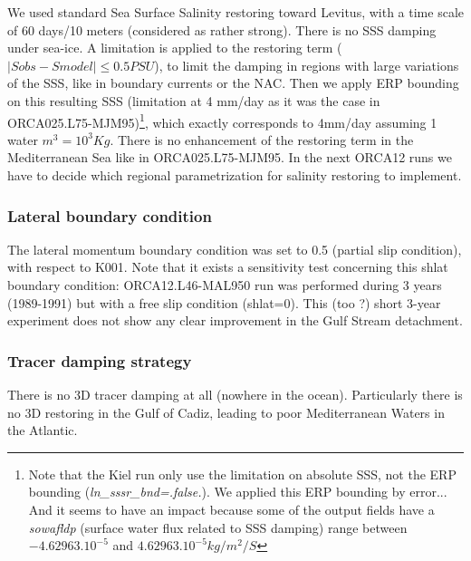 \documentclass[12pt]{article}
\begin{document}
We used standard Sea Surface Salinity restoring toward Levitus, with a time scale of 60 days/10 meters (considered as rather strong). There is no SSS damping under sea-ice. 
A limitation is applied to the restoring term ($|Sobs - Smodel| \leq 0.5 PSU$), to limit the damping in regions with large variations of the SSS, like in boundary currents or the NAC. 
Then we apply ERP bounding on this resulting SSS (limitation at 4 mm/day as it was the case in ORCA025.L75-MJM95)\footnote{Note that the Kiel run only use the limitation on absolute SSS, 
not the ERP bounding (\textit{ln\_sssr\_bnd=.false.}). 
We applied this ERP bounding by error... 
And it seems to have an impact because some of the output fields have a \textit{sowafldp} (surface water flux related to SSS damping) range between $-4.62963.10^{-5}$ and $4.62963.10^{-5} kg/m^2/S$}, 
which exactly corresponds to 4mm/day assuming 1 water $m^3=10^3 Kg$.
There is no enhancement of the restoring term in the Mediterranean Sea like in ORCA025.L75-MJM95. 
In the next ORCA12 runs we have to decide which regional parametrization for salinity restoring to implement.

\scriptsize


\normalsize

\subsubsection{Lateral boundary condition}

The lateral momentum boundary condition was set to 0.5 (partial slip condition), with respect to K001. Note that it exists a sensitivity test concerning this shlat boundary condition: ORCA12.L46-MAL950 run was performed during 3 years (1989-1991) but with a free slip condition (shlat=0). This (too ?) short 3-year experiment does not show any clear improvement in the Gulf Stream detachment.

\scriptsize


\normalsize

\subsubsection{Tracer damping strategy}

There is no 3D tracer damping at all (nowhere in the ocean). Particularly there is no 3D restoring in the Gulf of Cadiz, leading to poor Mediterranean Waters in the Atlantic.
\end{document}
